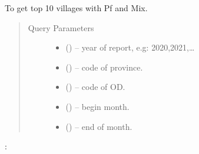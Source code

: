 \documentclass[letterpaper,10pt,english,openany,oneside]{sphinxmanual}
\begin{document}
\begin{fulllineitems}
\label{\detokenize{api-cmi/v1:get--api-malaria-info-v1-Surveillance-pf_mix}}
\sphinxAtStartPar
To get top 10 villages with Pf and Mix.
\begin{quote}\begin{description}
\item[{Query Parameters}] \leavevmode\begin{itemize}
\item {} 
\sphinxAtStartPar
{} () – year of report, e.g: 2020,2021,…

\item {} 
\sphinxAtStartPar
{} () – code of province.

\item {} 
\sphinxAtStartPar
{} () – code of OD.

\item {} 
\sphinxAtStartPar
{} () – begin month.

\item {} 
\sphinxAtStartPar
{} () – end of month.

\end{itemize}

\end{description}\end{quote}

\sphinxAtStartPar
{}:


\end{fulllineitems}
\end{document}
